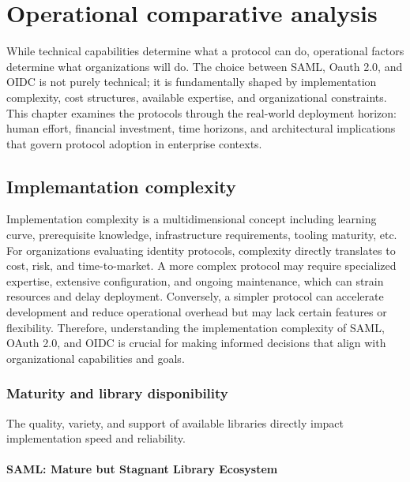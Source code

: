 \documentclass[../memoire.tex]{subfiles}
\begin{document}
\chapter{Operational comparative analysis} \label{ch_thd}

While technical capabilities determine what a protocol can do, operational factors determine what organizations will do. The choice between SAML, Oauth 2.0, and OIDC is not purely technical; it is fundamentally shaped by implementation complexity, cost structures, available expertise, and organizational constraints. This chapter examines the protocols through the real-world deployment horizon: human effort, financial investment, time horizons, and architectural implications that govern protocol adoption in enterprise contexts.


\section{Implemantation complexity}

Implementation complexity is a multidimensional concept including learning curve, prerequisite knowledge, infrastructure requirements, tooling maturity, etc. For organizations evaluating identity protocols, complexity directly translates to cost, risk, and time-to-market. A more complex protocol may require specialized expertise, extensive configuration, and ongoing maintenance, which can strain resources and delay deployment. Conversely, a simpler protocol can accelerate development and reduce operational overhead but may lack certain features or flexibility. Therefore, understanding the implementation complexity of SAML, OAuth 2.0, and OIDC is crucial for making informed decisions that align with organizational capabilities and goals.

\subsection{Maturity and library disponibility}

The quality, variety, and support of available libraries directly impact implementation speed and reliability. 

\subsubsection{SAML: Mature but Stagnant Library Ecosystem}
\end{document}
